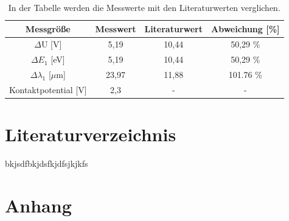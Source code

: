 \documentclass[titlepage = firstcover]{scrartcl}
\begin{document}
        \FloatBarrier
            
        \begin{table}[h]
          \centering
          \caption{In der Tabelle werden die Messwerte mit den Literaturwerten verglichen.}
        
          \begin{tabular}{c c c c}
              \toprule
              {Messgröße} & {Messwert} & {Literaturwert} & {Abweichung [\%]}\\
              \midrule
        
              $\Delta$U [V]                & 5,19    & 10,44  & 50,29 \%    \\
              $\Delta E_1$ [eV]             & 5,19  & 10,44 & 50,29 \%       \\
              $\Delta \lambda_1 $ [$\mu$m]   & 23,97     & 11,88  & 101.76 \%    \\
              Kontaktpotential [V]         & 2,3  & - &  -                  \\
              \bottomrule
          \end{tabular}
        \end{table}
  
        \FloatBarrier



    \section{Literaturverzeichnis}

            bkjsdfbkjdsfkjdfsjkjkfs


    \section{Anhang}
\end{document}
